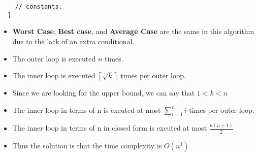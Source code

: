 \begin{enumerate}
\begin{enumerate}
\begin{lstlisting}
    // constants.
  }
\end{lstlisting}
      \begin{itemize}
      \item \textbf{Worst Case}, \textbf{Best case}, and \textbf{Average Case} are the same in this algorithm due to the lack of an extra conditional.
      \item The outer loop is executed $n$ times.
      \item The inner loop is executed $\left\lceil\sqrt{k}\right\rceil$ times per outer loop.
      \item Since we are looking for the upper bound, we can say that $1 < k < n$
      \item The inner loop in terms of n is excuted at most $\displaystyle \sum\limits_{i=1}^{n}i$ times per outer loop.
      \item The inner loop in terms of n in closed form is excuted at most $\frac{n(n+1)}{2}$
      \item Thus the solution is that the time complexity is $O(n^{3})$
      \end{itemize}
  \end{enumerate}
\end{enumerate}
